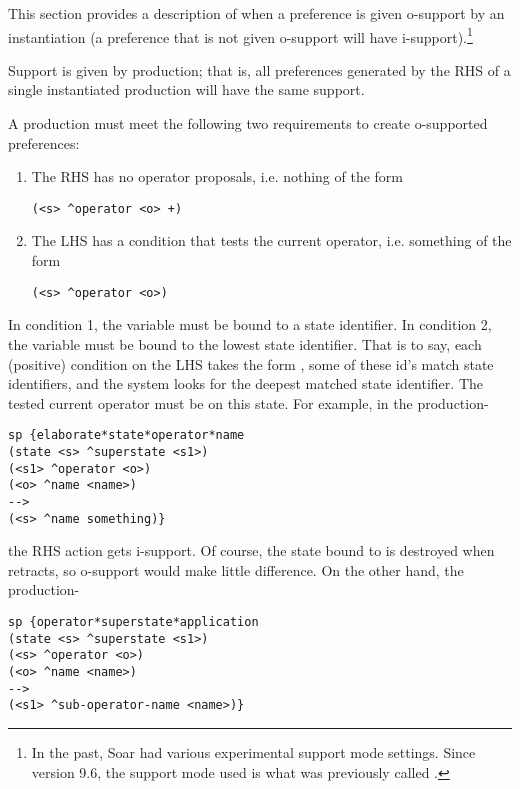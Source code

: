 This section provides a description of when a preference is given o-support by an instantiation (a preference that is not given o-support will have i-support).\footnote{In the past, Soar had various experimental support mode settings. Since version 9.6, the support mode used is what was previously called . }

Support is given by production; that is, all preferences generated by the RHS of a single instantiated production will have the same support. 

A production must meet the following two requirements to create o-supported preferences:
\begin{enumerate}
	\item The RHS has no operator proposals, i.e. nothing of the form \begin{verbatim}(<s> ^operator <o> +) \end{verbatim}
	\item The LHS has a condition that tests the current operator, i.e. something of the form
	\begin{verbatim}(<s> ^operator <o>)\end{verbatim}
\end{enumerate}

In condition 1, the variable  must be bound to a state identifier.
In condition 2, the variable  must be bound to the lowest state identifier. That is to say, each (positive) condition on the LHS takes the form , some of these id's match state identifiers, and the system looks for the deepest matched state identifier. The tested current operator must be on this state. For example, in the production-

\begin{verbatim}
sp {elaborate*state*operator*name
(state <s> ^superstate <s1>)
(<s1> ^operator <o>)
(<o> ^name <name>)
-->
(<s> ^name something)}
\end{verbatim}


the RHS action gets i-support. Of course, the state bound to  is destroyed when  retracts, so o-support would make little difference. On the other hand, the production- 

\begin{verbatim}
sp {operator*superstate*application
(state <s> ^superstate <s1>)
(<s> ^operator <o>)
(<o> ^name <name>)
-->
(<s1> ^sub-operator-name <name>)}
\end{verbatim}

